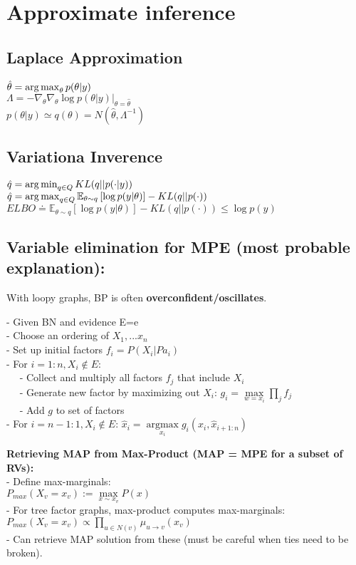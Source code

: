
\section{Approximate inference}
\subsection{Laplace Approximation}
$\hat\theta=\operatorname*{arg\,max}_\theta p(\theta\vert y)$\\
$\Lambda = -\nabla_\theta \nabla_\theta \log{p(\theta\vert y)}\vert_{\theta = \hat\theta}$\\
$p(\theta\vert y)\simeq q(\theta)=N(\hat\theta,\Lambda^{-1})$
\subsection{Variationa Inverence}
$\hat q = \operatorname*{arg\,min}_{q \in Q} KL(q\vert\vert p(\cdot\vert y))$\\
$\hat q = \operatorname*{arg\,max}_{q \in Q} \mathbb{E}_{\theta \sim q}\left[\log{p(y\vert\theta)}\right]-KL(q\vert\vert p(\cdot))$\\
$ELBO \doteq \mathbb{E}_{\theta \sim q}\left[\log{p(y\vert\theta)}\right]-KL(q\vert\vert p(\cdot)) \leq \log{p(y)}$


\subsection{Variable elimination for MPE (most probable explanation):}
With loopy graphs, BP is often \textbf{overconfident/oscillates}.

- Given BN and evidence E=e\\
- Choose an ordering of $X_1, ... x_n$\\
- Set up initial factors $f_i=P(X_i|Pa_i)$\\
- For $i=1:n, X_i \notin  E$:\\
$\quad$ - Collect and multiply all factors $f_j$ that include $X_i$\\
$\quad$ - Generate new factor by maximizing out $X_i$:
        $g_i=\underset{w=x_i}{\operatorname{max}}\prod_j f_j$\\
$\quad$ - Add $g$ to set of factors\\
- For $i=n-1:1, X_i\notin E$:
    $\hat{x}_i=\underset{x_i}{\operatorname{argmax}}g_i(x_i, \hat{x}_{i+1:n})$

\textbf{Retrieving MAP from Max-Product (MAP = MPE for a subset of RVs):}\\
- Define max-marginals:\\
    $P_{max}(X_v=x_v):=\underset{x\sim x_v}{\operatorname{max}}P(x)$\\
- For tree factor graphs, max-product computes max-marginals:\\
    $P_{max}(X_v=x_v)	\propto \prod_{u \in N(v)} \mu_{u \rightarrow v}(x_v)$\\
- Can retrieve MAP solution from these (must be careful when ties need to be broken).


